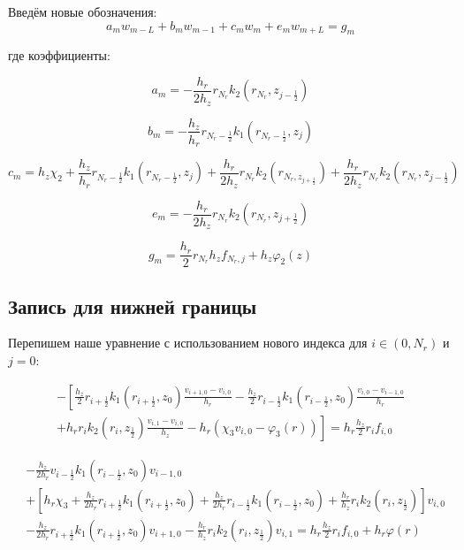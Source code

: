 Введём новые обозначения:
\[
  a_m w_{m - L} + b_m w_{m - 1} + c_m w_m + e_m w_{m + L} = g_m
\]

где коэффициенты:

\[
  a_m = - \frac{h_r}{2h_z} r_{N_r} k_2(r_{N_r}, z_{j - \frac{1}{2}})
\]

\[
  b_m = - \frac{h_z}{h_r} r_{N_r - \frac{1}{2}} k_1(r_{N_r - \frac{1}{2}}, z_j)
\]

\[
  c_m = h_z\chi_2  + \frac{h_z}{h_r} r_{N_r - \frac{1}{2}} k_1(r_{N_r -\frac{1}{2}}, z_j)
  + \frac{h_r}{2 h_z} r_{N_r} k_2(r_{N_r, z_{j + \frac{1}{2}}})
  + \frac{h_r}{2 h_z} r_{N_r} k_2 (r_{N_r}, z_{j - \frac{1}{2}})
\]

\[
  e_m = - \frac{h_r}{2 h_z} r_{N_r} k_2(r_{N_r}, z_{j + \frac{1}{2}})
\]

\[
  g_m =\frac{h_r}{2} r_{N_r} h_z f_{N_r, j} + h_z\varphi_2(z)
\]

\subsection{Запись для нижней границы}
Перепишем наше уравнение с использованием нового индекса для $i \in (0, N_r) $ и $ j = 0 $:

\begin{align*}
  - \left [ 
  \frac{h_z}{2} r_{i+\frac{1}{2}} k_1(r_{i+\frac{1}{2}}, z_0) \frac{v_{i+1, 0} - v_{i, 0}}{h_{r}}
  - \frac{h_z}{2} r_{i-\frac{1}{2}} k_1(r_{i-\frac{1}{2}}, z_0) \frac{v_{i, 0} - v_{i - 1, 0}}{h_{r}}
  \right . \\
  \left .
  + h_r r_{i} k_2(r_i, z_{\frac{1}{2}}) \frac{v_{i, 1} - v_{i, 0}}{h_{z}}
  - h_r(\chi_3 v_{i, 0} - \varphi_3(r))
  \right ]  = h_r \frac{h_z}{2} r_i f_{i, 0}
\end{align*}

\begin{align*}
  &  - \frac{h_z}{2 h_r} v_{i - \frac{1}{2}} k_1(r_{i - \frac{1}{2}}, z_0) v_{i - 1, 0} \\
  & + \left[ 
    h_r \chi_3 +\frac{h_z}{2 h_r} r_{i + \frac{1}{2}} k_1(r_{i + \frac{1}{2}}, z_0) + \frac{h_z}{2 h_r} r_{i - \frac{1}{2}} k_1(r_{i - \frac{1}{2}}, z_0)
    + \frac{h_r}{h_z} r_i k_2(r_i, z_{\frac{1}{2}}) 
  \right] v_{i, 0} \\
  & - \frac{h_z}{2 h_r} r_{i + \frac{1}{2}} k_1(r_{i + \frac{1}{2}}, z_0) v_{i + 1, 0} - \frac{h_r}{h_z} r_i k_2 (r_i, z_{\frac{1}{2}}) v_{i, 1}
  = h_r \frac{h_z}{2} r_i f_{i, 0} + h_r \varphi(r)
\end{align*}

